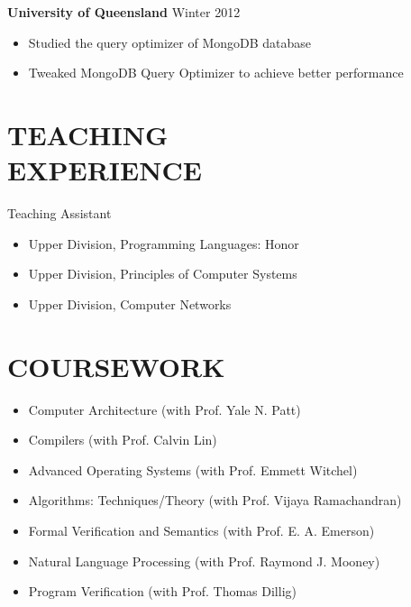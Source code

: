 \documentclass[margin, 9pt]{res} %
\begin{document}
\begin{resume}
\medskip
{\textbf{University of Queensland}} \hfill{Winter 2012}\\
\vspace*{-10pt}
\begin{itemize}[leftmargin=*] \itemsep -3pt
\vspace*{-5pt}
	\item Studied the query optimizer of MongoDB database
	\item Tweaked MongoDB Query Optimizer to achieve better performance 
\end{itemize}


\section{TEACHING\\ EXPERIENCE} 

{\large{Teaching Assistant}}\\
\vspace*{-5pt}
\begin{itemize}[leftmargin=*] \itemsep -2pt
\vspace*{-5pt}
	\item Upper Division, Programming Languages: Honor
	\item Upper Division, Principles of Computer Systems
	\item Upper Division, Computer Networks
\end{itemize}


\section{COURSEWORK} 

\vspace*{-2pt}
\begin{itemize}[leftmargin=*] \itemsep -2pt
	\item Computer Architecture (with Prof. Yale N. Patt)
	\item Compilers (with Prof. Calvin Lin)
	\item Advanced Operating Systems (with Prof. Emmett Witchel)
	\item Algorithms: Techniques/Theory (with Prof. Vijaya Ramachandran)
	\item Formal Verification and Semantics (with Prof. E. A. Emerson)
	\item Natural Language Processing (with Prof. Raymond J. Mooney)
	\item Program Verification (with Prof. Thomas Dillig)
\end{itemize}


\end{resume}
\end{document}
